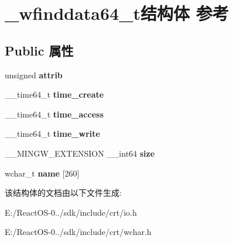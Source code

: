 \hypertarget{struct__wfinddata64__t}{}\section{\+\_\+wfinddata64\+\_\+t结构体 参考}
\label{struct__wfinddata64__t}
\subsection*{Public 属性}
\begin{DoxyCompactItemize}
\item 
\mbox{\label{struct__wfinddata64__t_a6028d2d8e3c5c8ef32e2edf3edd98d44}} 
unsigned {\bfseries attrib}
\item 
\mbox{\label{struct__wfinddata64__t_a5901f631ac1160b0d9eaa60ff62d0691}} 
\+\_\+\+\_\+time64\+\_\+t {\bfseries time\+\_\+create}
\item 
\mbox{\label{struct__wfinddata64__t_aef4780d1685fb814f0021057027959a6}} 
\+\_\+\+\_\+time64\+\_\+t {\bfseries time\+\_\+access}
\item 
\mbox{\label{struct__wfinddata64__t_af929a47080ac4ecf5e4651bb526577f5}} 
\+\_\+\+\_\+time64\+\_\+t {\bfseries time\+\_\+write}
\item 
\mbox{\label{struct__wfinddata64__t_a5a0c76aece06e5dda16acb324454eeb7}} 
\+\_\+\+\_\+\+M\+I\+N\+G\+W\+\_\+\+E\+X\+T\+E\+N\+S\+I\+ON \+\_\+\+\_\+int64 {\bfseries size}
\item 
\mbox{\label{struct__wfinddata64__t_a0e72a3f412ac42ded2188858f030a590}} 
wchar\+\_\+t {\bfseries name} \mbox{[}260\mbox{]}
\end{DoxyCompactItemize}


该结构体的文档由以下文件生成\+:\begin{DoxyCompactItemize}
\item 
E\+:/\+React\+O\+S-\/0../sdk/include/crt/io.\+h\item 
E\+:/\+React\+O\+S-\/0../sdk/include/crt/wchar.\+h\end{DoxyCompactItemize}
